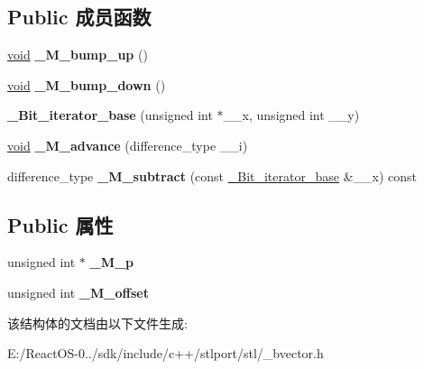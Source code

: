 \subsection*{Public 成员函数}
\begin{DoxyCompactItemize}
\item 
\mbox{\label{struct___bit__iterator__base_a8d84804b180acbb8fd563bb5cb96700b}} 
\hyperlink{interfacevoid}{void} {\bfseries \+\_\+\+M\+\_\+bump\+\_\+up} ()
\item 
\mbox{\label{struct___bit__iterator__base_ae320322c6dd69284a28efb54cae3c6b5}} 
\hyperlink{interfacevoid}{void} {\bfseries \+\_\+\+M\+\_\+bump\+\_\+down} ()
\item 
\mbox{\label{struct___bit__iterator__base_a7758d47894343f68e4f8d347f9df2de5}} 
{\bfseries \+\_\+\+Bit\+\_\+iterator\+\_\+base} (unsigned int $\ast$\+\_\+\+\_\+x, unsigned int \+\_\+\+\_\+y)
\item 
\mbox{\label{struct___bit__iterator__base_a98974c84e9dbbbfbf7b86234665a275a}} 
\hyperlink{interfacevoid}{void} {\bfseries \+\_\+\+M\+\_\+advance} (difference\+\_\+type \+\_\+\+\_\+i)
\item 
\mbox{\label{struct___bit__iterator__base_a8dcbf9b4a29a080619505d913ae6318e}} 
difference\+\_\+type {\bfseries \+\_\+\+M\+\_\+subtract} (const \hyperlink{struct___bit__iterator__base}{\+\_\+\+Bit\+\_\+iterator\+\_\+base} \&\+\_\+\+\_\+x) const
\end{DoxyCompactItemize}
\subsection*{Public 属性}
\begin{DoxyCompactItemize}
\item 
\mbox{\label{struct___bit__iterator__base_a469253979a1f20441830041d67bdc4e8}} 
unsigned int $\ast$ {\bfseries \+\_\+\+M\+\_\+p}
\item 
\mbox{\label{struct___bit__iterator__base_a9a6f9eeb7da7c83aa9070e72b07fbfea}} 
unsigned int {\bfseries \+\_\+\+M\+\_\+offset}
\end{DoxyCompactItemize}


该结构体的文档由以下文件生成\+:\begin{DoxyCompactItemize}
\item 
E\+:/\+React\+O\+S-\/0../sdk/include/c++/stlport/stl/\+\_\+bvector.\+h\end{DoxyCompactItemize}
